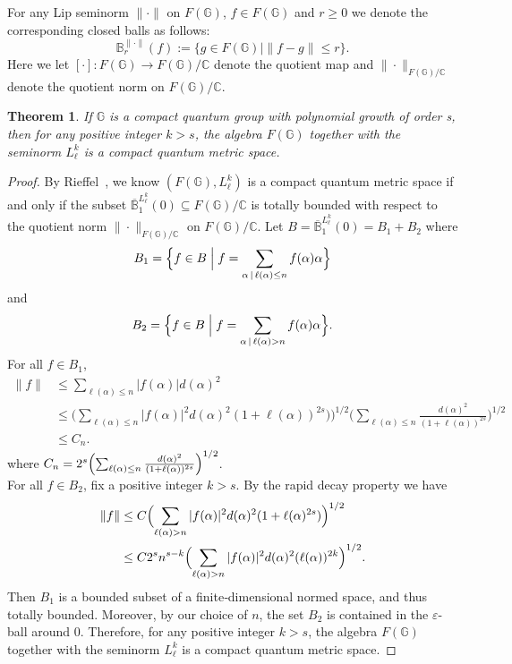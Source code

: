 \documentclass[12pt, reqno]{amsart}
\newtheorem{theorem}{Theorem}[section]
\theoremstyle{definition}
\theoremstyle{remark}
\numberwithin{equation}{section}
\begin{document}
For any Lip seminorm \(\|\cdot\|\) on \(F(\mathbb{G})\), \(f \in F(\mathbb{G})\) 
and \(r \geqslant 0\) we denote the corresponding closed balls as follows:
\[
\mathbb{B}_r^{\|\cdot\|}(f) := \{g \in F(\mathbb{G}) \mid \|f - g\| \leqslant r\} .
\]
Here we let \([\cdot]: F(\mathbb{G}) \to F(\mathbb{G})/\mathbb{C}\) denote the 
quotient map and \(\|\cdot\|_{F(\mathbb{G})/\mathbb{C}}\) denote the quotient 
norm on \(F(\mathbb{G})/\mathbb{C}\).

\begin{theorem}\label{compact quantum metric space on fusion algebra}
    If \(\mathbb{G}\) is a compact quantum group with polynomial growth of order s, then 
    for any positive integer \(k>s\), the algebra \(F(\mathbb{G})\) together 
    with the seminorm \(L_\ell^k\) is a compact quantum metric space.
\end{theorem}
\begin{proof}
    By Rieffel~\cite{9}, we know \((F(\mathbb{G}), L_\ell^k)\) is a compact quantum 
    metric space if and only if the subset 
    \(\overline{\mathbb{B}}_1^{L_\ell^k}(0)\subseteq F(\mathbb{G})/\mathbb{C}\) is 
    totally bounded with respect to the quotient norm 
    \(\|\cdot\|_{F(\mathbb{G})/\mathbb{C}}\) on \(F(\mathbb{G})/\mathbb{C}\). 
    Let \(B=\overline{\mathbb{B}}_1^{L_\ell^k}(0)=B_1+B_2\) where
    \[
    B_1 = \Bigl\{ f \in B \Bigm| f = \sum_{\alpha\,|\,\ell(\alpha)\le n} 
          f(\alpha)\alpha \Bigr\}
    \]
    and
    \[
    B_2 = \Bigl\{ f \in B \Bigm| f = \sum_{\alpha\,|\,\ell(\alpha)> n} 
          f(\alpha)\alpha \Bigr\}.
    \]
    For all \(f \in B_1\),
    \begin{align*}
        \|f\| &\le \sum_{\ell(\alpha)\le n} |f(\alpha)| d(\alpha)^2 \\
        &\le \biggl( \sum_{\ell(\alpha)\le n} |f(\alpha)|^2 d(\alpha)^2 
           (1+\ell(\alpha))^{2s}) \biggr)^{1/2}
           \biggl( \sum_{\ell(\alpha)\le n} 
           \frac{d(\alpha)^2}{(1+\ell(\alpha))^{2s}} \biggr)^{1/2} \\
        &\le C_n .
    \end{align*}
    where 
    \( C_n = 2^s\Bigl( \sum_{\ell(\alpha)\le n} 
      \frac{d(\alpha)^2}{(1+\ell(\alpha))^{2s}} \Bigr)^{1/2} \).\\
    For all \(f \in B_2\), fix a positive integer \(k> s\). By the rapid 
    decay property we have
    \begin{align*}
        \|f\| &\le C \Bigl( \sum_{\ell(\alpha)> n} |f(\alpha)|^2 d(\alpha)^2 
               (1+\ell(\alpha)^{2s}) \Bigr)^{1/2} \\
        &\le C 2^s n^{s-k} \Bigl( \sum_{\ell(\alpha)> n} |f(\alpha)|^2 
           d(\alpha)^2 (\ell(\alpha))^{2k} \Bigr)^{1/2}.
    \end{align*}
    Then \(B_1\) is a bounded subset of a finite‑dimensional normed space, and 
    thus totally bounded. Moreover, by our choice of \(n\), the set \(B_2\) is 
    contained in the \(\varepsilon\)-ball around \(0\). Therefore, for any positive 
    integer \(k> s\), the algebra \(F(\mathbb{G})\) together with the 
    seminorm \(L_\ell^k\) is a compact quantum metric space.
\end{proof}
\end{document}
